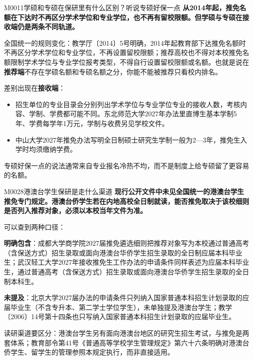 \begin{qa}{M0011}{学硕和专硕在保研里有什么区别？听说专硕好保一点}
\textbf{从2014年起，推免名额在下达时不再区分学术学位和专业学位，也不再有留校限额。但学硕与专硕在接收端仍是两条不同轨道。}

全国统一的规则变化：教学厅〔2014〕5号明确，2014年起教育部下达推免名额时不再区分学术学位和专业学位，不再设置留校限额；推荐高校也不得对本校推免名额限制学术学位与专业学位报考类型，不得自行设置留校限额或名额。也就是说在\textbf{推荐端}不存在学硕名额和专硕名额之分，你能不能被推荐只看校内排名。

差别出现在\textbf{接收端}：

\begin{itemize}
  \item 招生单位的专业目录会分别列出学术学位与专业学位专业的接收人数，考核内容、学制、学费都可能不同。东北师范大学2027年办法里直博生基本学制5年、学费每学年1万元，学制与收费另见学校文件。
  \item 中山大学2027年推免办法写明全日制硕士研究生学制一般为2—3年，推免生入学时均须缴纳学费。
\end{itemize}

专硕好保一点的说法通常来自专业报名冷热不均，而不是制度上给专硕留了更容易的名额。
\end{qa}

\begin{qa}{M0028}{港澳台学生保研是走什么渠道}
\textbf{现行公开文件中未见全国统一的港澳台学生推免专门规定。港澳台侨学生若在内地高校全日制就读，能否推免取决于该校细则是否列入推荐对象，必须以本校当年文件为准。}

可以查到两种口径：

\textbf{明确包含}：成都大学商学院2027届推免遴选细则把推荐对象写为本校通过普通高考（含保送方式）招生录取或面向港澳台华侨学生招生录取的全日制应届本科毕业生；武汉轻工大学2027年接收推免生工作办法的申请条件同样表述为应届本科毕业生，通过普通高考（含保送方式）招生录取或面向港澳台华侨学生招生录取的全日制本科生。

\textbf{未提及}：北京大学2027届办法的申请条件只列纳入国家普通本科招生计划录取的应届毕业生（不含专升本、第二学士学位学生），未单独提及港澳台学生；教学〔2006〕14号第十四条也只写纳入国家普通本科招生计划录取的应届毕业生。

读研渠道要区分：港澳台学生另有面向港澳台地区的研究生招生考试，与推免是两套体系；教育部令第41号《普通高等学校学生管理规定》第六十六条明确对港澳台侨学生、留学生的管理参照本规定执行，而非直接适用。
\end{qa}

